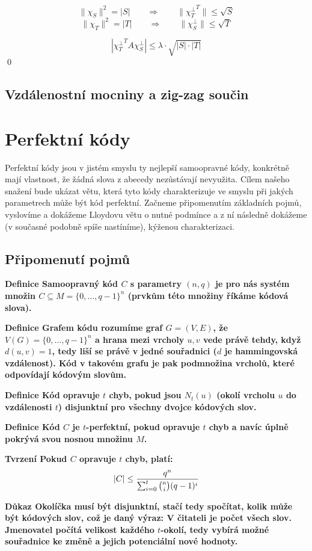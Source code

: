 \documentclass[a4paper,12pt,titlepage]{article}
\newcommand{\dk}{\smallskip\noindent\bf Důkaz\rm{} }
\newcommand{\df}{\smallskip\noindent\bf Definice\rm{} }
\newcommand{\tv}{\smallskip\noindent\bf Tvrzení\rm{} }
\newcommand{\xttt}{{\chi_T^\bot}^T}
\begin{document}
$$\|\chi_S\|^2 = |S| \qquad\Rightarrow\qquad \|\xttt\| \le \sqrt S$$
$$\|\chi_T\|^2 = |T| \qquad\Rightarrow\qquad \|\chi_S^\bot\| \le \sqrt T$$

$$|\xttt A\chi_S^\bot| \le \lambda\cdot\sqrt{|S|\cdot |T|}$$
\qed


\subsection{Vzdálenostní mocniny a zig-zag součin}

\section{Perfektní kódy}

Perfektní kódy jsou v jistém smyslu ty nejlepší samoopravné kódy, konkrétně mají vlastnost, že žádná slova z abecedy nezůstávají nevyužita. Cílem našeho snažení bude ukázat větu, která tyto kódy charakterizuje ve smyslu při jakých parametrech může být kód perfektní. Začneme připomenutím základních pojmů, vyslovíme a dokážeme Lloydovu větu o nutné podmínce a z ní následně dokážeme (v současné podobně spíše nastíníme), kýženou charakterizaci.

\subsection{Připomenutí pojmů}

\df Samoopravný kód $C$ s parametry $(n,q)$ je pro nás systém množin $C \subseteq M = \{0, \ldots, q-1\}^n$ (prvkům této množiny říkáme kódová slova).

\df Grafem kódu rozumíme graf $G=(V,E)$, že $V(G) = \{0, \ldots, q-1 \}^n$ a hrana mezi vrcholy $u,v$ vede právě tehdy, když $d(u,v) = 1$, tedy liší se právě v jedné souřadnici ($d$ je hammingovská vzdálenost). Kód v takovém grafu je pak podmnožina vrcholů, které odpovídají kódovým slovům.

\df Kód opravuje $t$ chyb, pokud jsou $N_t(u)$ (okolí vrcholu $u$ do vzdálenosti $t$) disjunktní pro všechny dvojce kódových slov.

\df Kód $C$ je $t$-perfektní, pokud opravuje $t$ chyb a navíc úplně pokrývá svou nosnou množinu $M$.

\tv Pokud $C$ opravuje $t$ chyb, platí:
\begin{align*}
	|C| \leq { q^n \over \sum_{i=0}^t \binom{n}{i} (q-1)^i }
\end{align*}

\dk Okolíčka musí být disjunktní, stačí tedy spočítat, kolik může být kódových
slov, což je daný výraz: V čitateli je počet všech slov. Jmenovatel počítá
velikost každého $t$-okolí, tedy vybírá možné souřadnice ke změně a jejich
potenciální nové hodnoty.
\end{document}
